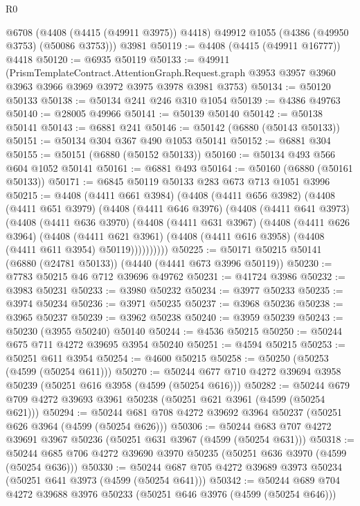 \begin{lexlean}{R0}
\begin{coremodule}
    @6708 (@4408 (@4415 (@49911 @3975)) @4418) @49912 @1055 (@4386 (@49950 @3753) (@50086 @3753)))
    @3981
@50119 := @4408 (@4415 (@49911 @16777)) @4418
@50120 := @6935 @50119
@50133 := @49911
    (PrismTemplateContract.AttentionGraph.Request.graph
      @3953
      @3957
      @3960
      @3963
      @3966
      @3969
      @3972
      @3975
      @3978
      @3981
      @3753)
@50134 := @50120 @50133
@50138 := @50134 @241 @246 @310 @1054
@50139 := @4386 @49763
@50140 := @28005 @49966
@50141 := @50139 @50140
@50142 := @50138 @50141
@50143 := @6881 @241
@50146 := @50142 (@6880 (@50143 @50133))
@50151 := @50134 @304 @367 @490 @1053 @50141
@50152 := @6881 @304
@50155 := @50151 (@6880 (@50152 @50133))
@50160 := @50134 @493 @566 @604 @1052 @50141
@50161 := @6881 @493
@50164 := @50160 (@6880 (@50161 @50133))
@50171 := @6845 @50119 @50133 @283 @673 @713 @1051 @3996
@50215 := @4408
    (@4411 @661 @3984)
    (@4408
      (@4411 @656 @3982)
      (@4408
        (@4411 @651 @3979)
        (@4408
          (@4411 @646 @3976)
          (@4408
            (@4411 @641 @3973)
            (@4408
              (@4411 @636 @3970)
              (@4408
                (@4411 @631 @3967)
                (@4408
                  (@4411 @626 @3964)
                  (@4408
                    (@4411 @621 @3961)
                    (@4408 (@4411 @616 @3958) (@4408 (@4411 @611 @3954) @50119))))))))))
@50225 := @50171 @50215 @50141 (@6880 (@24781 @50133)) (@4440 (@4441 @673 @3996 @50119))
@50230 := @7783 @50215 @46 @712 @39696 @49762
@50231 := @41724 @3986
@50232 := @3983 @50231
@50233 := @3980 @50232
@50234 := @3977 @50233
@50235 := @3974 @50234
@50236 := @3971 @50235
@50237 := @3968 @50236
@50238 := @3965 @50237
@50239 := @3962 @50238
@50240 := @3959 @50239
@50243 := @50230 (@3955 @50240) @50140
@50244 := @4536 @50215
@50250 := @50244 @675 @711 @4272 @39695 @3954 @50240
@50251 := @4594 @50215
@50253 := @50251 @611 @3954
@50254 := @4600 @50215
@50258 := @50250 (@50253 (@4599 (@50254 @611)))
@50270 := @50244 @677 @710 @4272 @39694 @3958 @50239 (@50251 @616 @3958 (@4599 (@50254 @616)))
@50282 := @50244 @679 @709 @4272 @39693 @3961 @50238 (@50251 @621 @3961 (@4599 (@50254 @621)))
@50294 := @50244 @681 @708 @4272 @39692 @3964 @50237 (@50251 @626 @3964 (@4599 (@50254 @626)))
@50306 := @50244 @683 @707 @4272 @39691 @3967 @50236 (@50251 @631 @3967 (@4599 (@50254 @631)))
@50318 := @50244 @685 @706 @4272 @39690 @3970 @50235 (@50251 @636 @3970 (@4599 (@50254 @636)))
@50330 := @50244 @687 @705 @4272 @39689 @3973 @50234 (@50251 @641 @3973 (@4599 (@50254 @641)))
@50342 := @50244 @689 @704 @4272 @39688 @3976 @50233 (@50251 @646 @3976 (@4599 (@50254 @646)))

\end{coremodule}
\end{lexlean}
